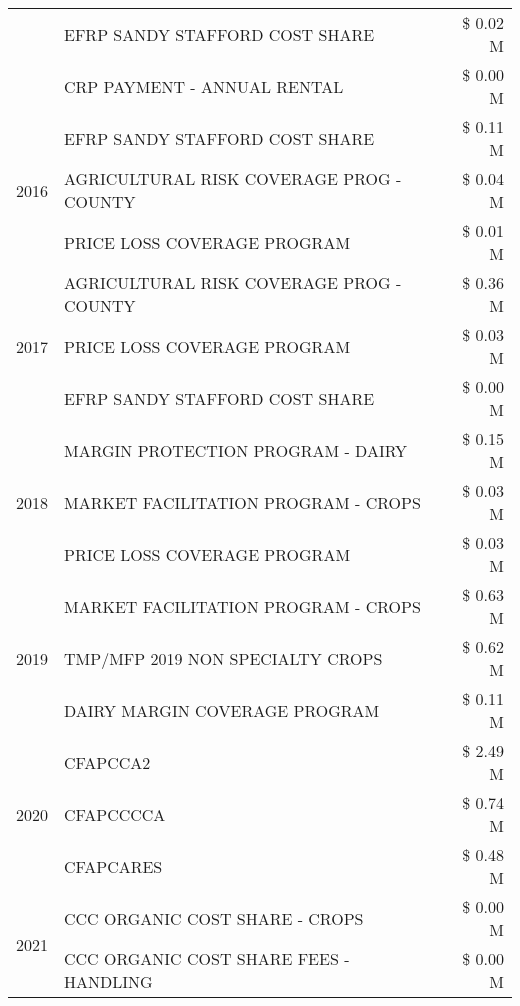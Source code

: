 \begin{tabular}{llr}
 & EFRP SANDY STAFFORD COST SHARE & \$ 0.02 M \\
 & CRP PAYMENT - ANNUAL RENTAL & \$ 0.00 M \\
\cline{1-3}
\multirow[t]{3}{*}{2016} & EFRP SANDY STAFFORD COST SHARE & \$ 0.11 M \\
 & AGRICULTURAL RISK COVERAGE PROG - COUNTY & \$ 0.04 M \\
 & PRICE LOSS COVERAGE PROGRAM & \$ 0.01 M \\
\cline{1-3}
\multirow[t]{3}{*}{2017} & AGRICULTURAL RISK COVERAGE PROG - COUNTY & \$ 0.36 M \\
 & PRICE LOSS COVERAGE PROGRAM & \$ 0.03 M \\
 & EFRP SANDY STAFFORD COST SHARE & \$ 0.00 M \\
\cline{1-3}
\multirow[t]{3}{*}{2018} & MARGIN PROTECTION PROGRAM - DAIRY & \$ 0.15 M \\
 & MARKET FACILITATION PROGRAM - CROPS & \$ 0.03 M \\
 & PRICE LOSS COVERAGE PROGRAM & \$ 0.03 M \\
\cline{1-3}
\multirow[t]{3}{*}{2019} & MARKET FACILITATION PROGRAM - CROPS & \$ 0.63 M \\
 & TMP/MFP 2019 NON SPECIALTY CROPS & \$ 0.62 M \\
 & DAIRY MARGIN COVERAGE PROGRAM & \$ 0.11 M \\
\cline{1-3}
\multirow[t]{3}{*}{2020} & CFAPCCA2 & \$ 2.49 M \\
 & CFAPCCCCA & \$ 0.74 M \\
 & CFAPCARES & \$ 0.48 M \\
\cline{1-3}
\multirow[t]{2}{*}{2021} & CCC ORGANIC COST SHARE - CROPS & \$ 0.00 M \\
 & CCC ORGANIC COST SHARE FEES - HANDLING & \$ 0.00 M \\
\cline{1-3}
\bottomrule
\end{tabular}
